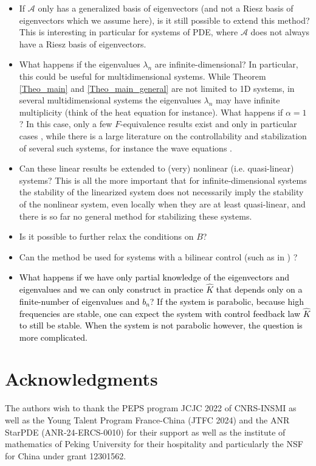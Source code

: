 \documentclass[11pt, dvipsnames]{amsart}
\begin{document}
\begin{itemize}
    \item If $\mathcal{A}$ only has a generalized basis of eigenvectors (and not a Riesz basis of eigenvectors which we assume here), is it still possible to extend this method? This is interesting in particular for systems of PDE, where $\mathcal{A}$ does not always have a Riesz basis of eigenvectors.
    \item What happens if the eigenvalues $\lambda_{n}$ are infinite-dimensional? In particular, this could be useful for multidimensional systems. While Theorem \ref{Theo_main} and \ref{Theo_main_general} are not limited to 1D systems, in several multidimensional systems the eigenvalues $\lambda_{n}$ may have infinite multiplicity (think of the heat equation for instance).
       What happens if $\alpha=1$ ? In this case, only a few $F$-equivalence results exist and only in particular cases \cite{zhang2022internal,Coron2022-stabilization}, while there is a large literature on the controllability and stabilization of several such systems, for instance the wave equations \cite{jaffard1998singular,valein2009stabilization}.
   \item Can these linear results be extended to (very) nonlinear (i.e. quasi-linear) systems? This is all the more important that for infinite-dimensional systems the stability of the linearized system does not necessarily imply the stability of the nonlinear system, even locally \cite{coron2015dissipative} when they are at least quasi-linear, and there is so far no general method for stabilizing these systems.
    \item Is it possible to further relax the conditions on $B$? 
    \item Can the method be used for systems with a bilinear control (such as in \cite{alabau2021superexponential}) ?
    \item \textcolor{black}{What happens if we have only partial knowledge of the eigenvectors and eigenvalues and we can only construct in practice $\hat{K}$ that depends only on a finite-number of eigenvalues and $b_{n}$? If the system is parabolic, because high frequencies are stable, one can expect the system with control feedback law $\hat{K}$ to still be stable. When the system is not parabolic however, the question is more complicated.}
\end{itemize}



\section*{Acknowledgments}
The authors wish to thank the PEPS program JCJC 2022 of CNRS-INSMI as well as the Young Talent Program France-China (JTFC 2024) and the ANR StarPDE (ANR-24-ERCS-0010) for their support as well as the institute of mathematics of Peking University for their hospitality and particularly the NSF for China under grant 12301562.
\appendix
\end{document}
